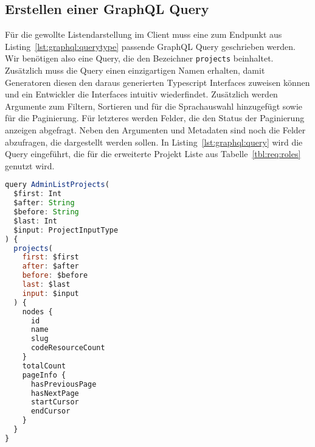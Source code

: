 
\subsection{Erstellen einer GraphQL Query}
\label{impl:graphql:query}
Für die gewollte Listendarstellung im Client muss eine zum Endpunkt aus Listing~\ref{lst:graphql:querytype} passende GraphQL Query geschrieben werden. Wir benötigen also eine Query, die den Bezeichner \texttt{projects} beinhaltet. Zusätzlich muss die Query einen einzigartigen Namen erhalten, damit Generatoren diesen den daraus generierten Typescript Interfaces zuweisen können und ein Entwickler die Interfaces intuitiv wiederfindet. Zusätzlich werden Argumente zum Filtern, Sortieren und für die Sprachauswahl hinzugefügt sowie für die Paginierung. Für letzteres werden Felder, die den Status der Paginierung anzeigen abgefragt. Neben den Argumenten und Metadaten 
sind noch die Felder abzufragen, die dargestellt werden sollen.
In Listing~\ref{lst:graphql:query} wird die Query eingeführt, die für die erweiterte Projekt Liste aus Tabelle~\ref{tbl:req:roles} genutzt wird.

\begin{lstlisting}[language=JavaScript,float=h!,caption={GraphQL Query für eine paginierte Listendarstellung mit Möglichkeit des Filterns, der Sortierung und der Sprachauswahl}, label={lst:graphql:query}]
query AdminListProjects(
  $first: Int
  $after: String
  $before: String
  $last: Int
  $input: ProjectInputType
) {
  projects(
    first: $first
    after: $after
    before: $before
    last: $last
    input: $input
  ) {
    nodes {
      id
      name
      slug
      codeResourceCount
    }
	totalCount
	pageInfo {
	  hasPreviousPage
	  hasNextPage
	  startCursor
	  endCursor
	}
  }
}
\end{lstlisting}

